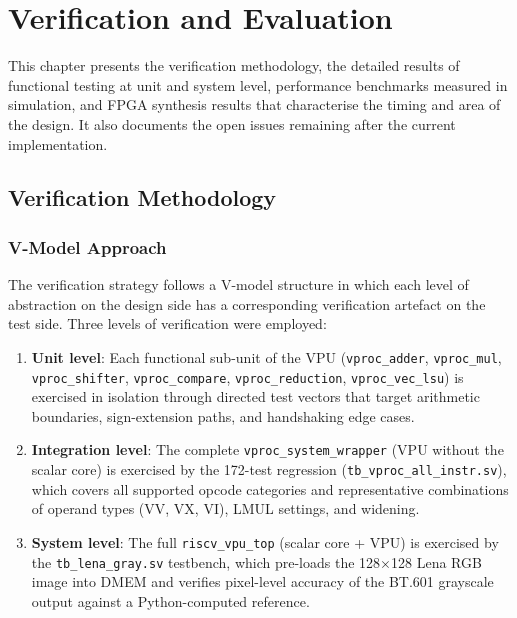\chapter{Verification and Evaluation}
\label{ch:evaluation}

This chapter presents the verification methodology, the detailed results of functional
testing at unit and system level, performance benchmarks measured in simulation, and
FPGA synthesis results that characterise the timing and area of the design. It also
documents the open issues remaining after the current implementation.

\section{Verification Methodology}
\label{sec:verif_method}

\subsection{V-Model Approach}

The verification strategy follows a V-model structure in which each level of abstraction
on the design side has a corresponding verification artefact on the test side. Three
levels of verification were employed:

\begin{enumerate}
  \item \textbf{Unit level}: Each functional sub-unit of the VPU (\texttt{vproc\_adder},
        \texttt{vproc\_mul}, \texttt{vproc\_shifter}, \texttt{vproc\_compare},
        \texttt{vproc\_reduction}, \texttt{vproc\_vec\_lsu}) is exercised in isolation
        through directed test vectors that target arithmetic boundaries, sign-extension
        paths, and handshaking edge cases.
  \item \textbf{Integration level}: The complete \texttt{vproc\_system\_wrapper} (VPU
        without the scalar core) is exercised by the 172-test regression
        (\texttt{tb\_vproc\_all\_instr.sv}), which covers all supported opcode categories
        and representative combinations of operand types (VV, VX, VI), LMUL settings,
        and widening.
  \item \textbf{System level}: The full \texttt{riscv\_vpu\_top} (scalar core + VPU) is
        exercised by the \texttt{tb\_lena\_gray.sv} testbench, which pre-loads the
        128$\times$128 Lena RGB image into DMEM and verifies pixel-level accuracy of the
        BT.601 grayscale output against a Python-computed reference.
\end{enumerate}

